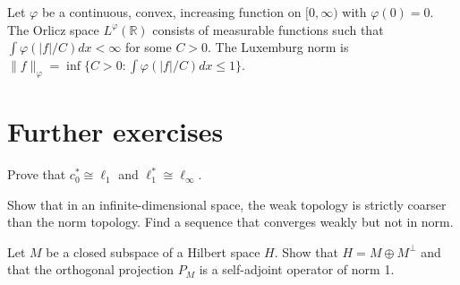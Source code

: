 \begin{example}
\label{example-orlicz-space}
Let $\varphi$ be a continuous, convex,
increasing function on $[0, \infty)$ with
$\varphi(0)=0$. The Orlicz space
$L^\varphi(\mathbb{R})$ consists of
measurable functions such that $\int
\varphi(|f|/C) dx < \infty$ for some $C > 0$.
The Luxemburg norm is $\|f\|_\varphi = \inf
\{ C > 0 : \int \varphi(|f|/C) dx \leq 1 \}$.
\end{example}

\section{Further exercises}
\label{section-functional-analysis-exercises}

\begin{exercise}
\label{exercise-dual-c0-l1}
Prove that $c_0^* \cong \ell_1$ and $\ell_1^*
\cong \ell_\infty$.
\end{exercise}

\begin{exercise}
\label{exercise-weak-vs-strong}
Show that in an infinite-dimensional space,
the weak topology is strictly coarser than
the norm topology. Find a sequence that
converges weakly but not in norm.
\end{exercise}

\begin{exercise}
\label{exercise-hilbert-projection}
Let $M$ be a closed subspace of a Hilbert
space $H$. Show that $H = M \oplus M^\perp$
and that the orthogonal projection $P_M$ is a
self-adjoint operator of norm 1.
\end{exercise}



